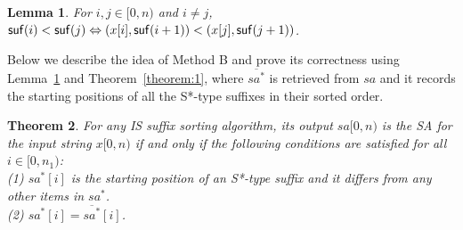 \documentclass[10pt,journal,compsoc]{IEEEtran}
\newtheorem{theorem}{Theorem}[section]
\newtheorem{lemma}[theorem]{Lemma}
\begin{document}
\begin{lemma} \label{lemma:1}
	For $i, j \in [0, n)$ and $i \ne j$, ${\sf suf}(i) < {\sf suf}(j) \Leftrightarrow (x[i], {\sf suf}(i + 1)) < (x[j], {\sf suf}(j + 1))$.
\end{lemma}

Below we describe the idea of Method B and prove its correctness using Lemma~\ref{lemma:1} and Theorem~\ref{theorem:1}, where $\overline{sa^*}$ is retrieved from $sa$ and it records the starting positions of all the S*-type suffixes in their sorted order.

\begin{theorem} \label{theorem:2}
	For any IS suffix sorting algorithm, its output $sa[0, n)$ is the SA for the input string $x[0, n)$ if and only if the following conditions are satisfied for all $i \in [0, n_1)$: \\
	(1) $sa^*[i]$ is the starting position of an S*-type suffix and it differs from any other items in $sa^*$. \\
	(2) $sa^*[i] = \overline{sa^*}[i]$. \\
\end{theorem}
\end{document}
